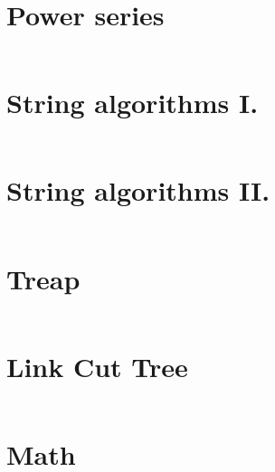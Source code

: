 \documentclass[12pt,english]{article}
\begin{document}
\section{Power series}
\inputminted[autogobble,breaklines,mathescape,linenos,numbersep=5pt,xleftmargin=0pt,fontsize=\footnotesize]{cpp}{codes/power_series.tex}

\section{String algorithms I.}
\inputminted[autogobble,breaklines,mathescape,linenos,numbersep=5pt,xleftmargin=0pt,fontsize=\footnotesize]{cpp}{codes/str_alg.tex}

\section{String algorithms II.}
\inputminted[autogobble,breaklines,mathescape,linenos,numbersep=5pt,xleftmargin=0pt,fontsize=\footnotesize]{cpp}{codes/suff_arr.tex}

\section{Treap}
\inputminted[autogobble,breaklines,mathescape,linenos,numbersep=5pt,xleftmargin=0pt,fontsize=\footnotesize]{cpp}{codes/treap.tex}

\section{Link Cut Tree}
\inputminted[autogobble,breaklines,mathescape,linenos,numbersep=5pt,xleftmargin=0pt,fontsize=\footnotesize]{cpp}{codes/link_cut_tree.tex}

\section{Math}
\inputminted[autogobble,breaklines,mathescape,linenos,numbersep=5pt,xleftmargin=0pt,fontsize=\footnotesize]{cpp}{codes/extra_math.tex}

\end{document}
